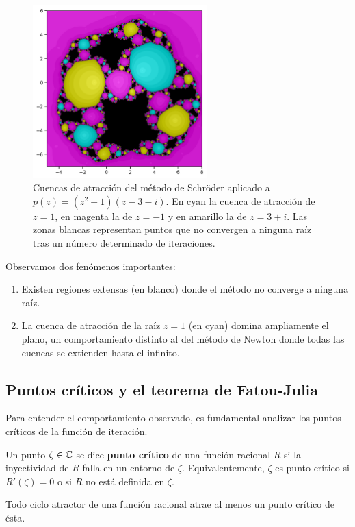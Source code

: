 \begin{figure}[H]
\centering 
\includegraphics[width=0.6\textwidth]{img/sch_3+i.png}
\caption{Cuencas de atracción del método de Schröder aplicado a $p(z)=(z^2-1)(z-3-i)$. En cyan la cuenca de atracción de $z=1$, en magenta la de $z=-1$ y en amarillo la de $z=3+i$. Las zonas blancas representan puntos que no convergen a ninguna raíz tras un número determinado de iteraciones.}
\label{fig:cuenca_cubica_1}
\end{figure}

Observamos dos fenómenos importantes:
\begin{enumerate}
\item Existen regiones extensas (en blanco) donde el método no converge a ninguna raíz.
\item La cuenca de atracción de la raíz $z=1$ (en cyan) domina ampliamente el plano, un comportamiento distinto al del método de Newton donde todas las cuencas se extienden hasta el infinito.
\end{enumerate}

\subsection{Puntos críticos y el teorema de Fatou-Julia}

Para entender el comportamiento observado, es fundamental analizar los puntos críticos de la función de iteración.

Un punto $\zeta\in\mathbb{C}$ se dice \textbf{punto crítico} de una función racional $R$ si la inyectividad de $R$ falla en un entorno de $\zeta$. Equivalentemente, $\zeta$ es punto crítico si $R'(\zeta)=0$ o si $R$ no está definida en $\zeta$.

\begin{teorema}
\label{teo:fatou_julia}
Todo ciclo atractor de una función racional atrae al menos un punto crítico de ésta.
\end{teorema}

